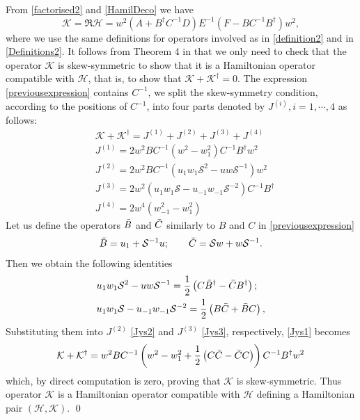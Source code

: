 \documentclass[fleqn,11pt,twoside]{article}
\makeatletter
\renewenvironment{proof}[1][\proofname]{\par
  \normalfont
  \topsep6\p@\@plus6\p@ \trivlist
  \item[\hskip\labelsep\textbf{%
    #1\@addpunct{.}}]\ignorespaces
}{%
  \qed\endtrivlist
}
\theoremstyle{definition}
\makeatother
\begin{document}
	\begin{proof} From \eqref{factorised2} and \eqref{HamilDeco} we have
		\begin{equation}
			\mathcal{K} = \mathfrak{R}\mathcal{H}=w^2 \left(A + B^\dagger C^{-1} D\right)
E^{-1}\left(F - B C^{-1} B^\dagger\right) w^2,
			\label{previousexpression}
		\end{equation}
where we use the same definitions for operators involved as in \eqref{definition2} and in \eqref{Definitions2}.
It follows from Theorem 4 in \cite{42} that we only need to
check that the operator $\mathcal{K}$ is skew-symmetric to show that
it is a Hamiltonian operator compatible
with $\mathcal{H}$, that is, to show that $\mathcal{K}+\mathcal{K}^\dagger=0$.
		The expression \eqref{previousexpression} contains $C^{-1}$, we split the skew-symmetry condition, according to the
positions of $C^{-1}$, into four parts denoted by  $J^{(i)}, i=1, \cdots, 4$ as follows:
		\begin{subequations}
			\begin{align}
				& \mathcal{K} + \mathcal{K}^\dagger =
J^{(1)}+J^{(2)}+J^{(3)}+J^{(4)} \label{Jys1}\\
				& J^{(1)} = 2 w^2 B C^{-1}
\left(w^2-w_1^2\right) C^{-1} B^{\dagger} w^2\\
				& J^{(2)} = 2 w^2 B C^{-1} \left( u_1 w_1
\mathcal{S}^2- u w \mathcal{S}^{-1} \right) w^2 \label{Jys2}\\
				& J^{(3)} = 2 w^2 \left(u_1 w_1
\mathcal{S}-u_{-1}w_{-1} \mathcal{S}^{-2}\right) C^{-1} B^\dagger \label{Jys3}\\
				& J^{(4)} = 2 w^4 \left( w_{-1}^2 -w_1^2\right)
			\end{align}
			\label{Jys}
		\end{subequations}
Let us define the operators $\Bar{B}$ and $\Bar{C}$ similarly to $B$ and
$C$ in \eqref{previousexpression}
		\begin{equation*}
			\Bar{B} = u_1 + \mathcal{S}^{-1} u;\qquad \Bar{C} =
\mathcal{S} w + w \mathcal{S}^{-1}.
		\end{equation*}
Then we obtain the following identities
		\begin{subequations}
			\begin{align*}
				&  u_1 w_1 \mathcal{S}^2- u w \mathcal{S}^{-1} =
\frac{1}{2} \left( C \Bar{B}^\dagger-\Bar{C} B^\dagger \right);\\
				&  u_1 w_1 \mathcal{S} - u_{-1}w_{-1}
\mathcal{S}^{-2} = \frac{1}{2} \left(B \Bar{C}+\Bar{B} C\right),
			\end{align*}
		\end{subequations}
Substituting them into  $J^{(2)}$ \eqref{Jys2} and $J^{(3)}$ \eqref{Jys3}, respectively,  \eqref{Jys1} becomes
		\begin{equation*}
			\mathcal{K} + \mathcal{K}^\dagger  = w^2 B C^{-1}
\left(w^2-w_1^2 + \frac{1}{2} \left( C \Bar{C} - \Bar{C} C \right)\right) C^{-1}
B^{\dagger} w^2
		\end{equation*}
		which, by direct computation is zero, proving that $\mathcal{K}$
is skew-symmetric. Thus  operator $\mathcal{K}$ is a Hamiltonian operator
compatible with $\mathcal{H}$ defining a Hamiltonian pair
$(\mathcal{H},\mathcal{K})$.
\end{proof}
\end{document}
